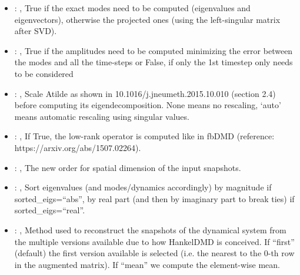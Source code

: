 \begin{itemize}
    \item {}: , 
      True if the exact modes need to be computed (eigenvalues and
      eigenvectors),   otherwise the projected ones (using the left-singular matrix after SVD).

    \item {}: , 
      True if the amplitudes need to be computed minimizing the error
      between the modes and all the time-steps or False, if only the 1st timestep only needs to be
      considered

    \item {}: , 
      Scale Atilde as shown in 10.1016/j.jneumeth.2015.10.010 (section 2.4) before computing its
      eigendecomposition. None means no rescaling, ‘auto’ means automatic rescaling using singular
      values.

    \item {}: , 
      If True, the low-rank operator is computed like in fbDMD (reference:
      https://arxiv.org/abs/1507.02264).

    \item {}: , 
      The new order for spatial dimension of the input snapshots.

    \item {}: , 
      Sort eigenvalues (and modes/dynamics accordingly) by magnitude if sorted\_eigs=``abs'',
      by real part (and then by imaginary part to break ties) if sorted\_eigs=``real''.

    \item {}: , 
      Method used to reconstruct the snapshots of the dynamical system from the multiple versions
      available                                                  due to how HankelDMD is conceived.
      If ``first'' (default) the first version available is selected
      (i.e. the nearest to the 0-th row in the augmented matrix). If ``mean'' we compute the
      element-wise mean.
  \end{itemize}

